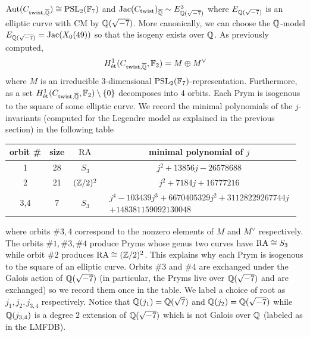 \documentclass[main.tex]{subfiles}
\begin{document}
$\operatorname{\mathrm{Aut}}(C_{\mathrm{twist}, \overline{\mathbb{Q}}}) \cong \mathrm{PSL}_2(\mathbb{F}_7)$ and $\operatorname{\mathrm{Jac}}(C_{\mathrm{twist}})_{\overline{\mathbb{Q}}} \sim E_{\mathbb{Q}(\sqrt{-7})}^3$ where $E_{\mathbb{Q}(\sqrt{-7})}$ is an elliptic curve with CM by $\mathbb{Q}(\sqrt{-7})$. More canonically, we can choose the $\mathbb{Q}$-model $E_{\mathbb{Q}(\sqrt{-7})} = \operatorname{\mathrm{Jac}}(X_0(49))$ so that the isogeny exists over $\mathbb{Q}$. As previously computed,
\[ H^1_{\mathrm{\acute{e}t}}(C_{\mathrm{twist}, \overline{\mathbb{Q}}}, \mathbb{F}_2) = M \oplus M^{\vee} \]
where $M$ is an irreducible $3$-dimensional $\mathrm{PSL}_2(\mathbb{F}_7)$-representation. Furthermore, as a set $H^1_{\mathrm{\acute{e}t}}(C_{\mathrm{twist}, \overline{\mathbb{Q}}}, \mathbb{F}_2) \setminus \{ 0 \}$ decomposes into 4 orbits. Each Prym is isogenous to the square of some elliptic curve. We record the minimal polynomials of the $j$-invariants (computed for the Legendre model as explained in the previous section) in the following table
\begin{center} \label{table:Klein_orbits}
\begin{tabular}{c|c|c|c}
orbit \# & size & $\operatorname{\mathrm{RA}}$ &  minimal polynomial of $j$
\\
\hline
1 & 28 & $S_3$ & $j^2 + 13856 j - 26578688$
\\
2 & 21 & $(\mathbb{Z}/2)^2$ & $j^2 + 7184 j + 16777216$
\\
3,4 & 7 & $S_3$ & $\substack{j^4 - 103439 j^3 + 6670405329 j^2 + 31128229267744 j \\ + 148381159092130048}$
\end{tabular}
\end{center}
where orbits $\# 3,4$ correspond to the nonzero elements of $M$ and $M^{\vee}$ respectively. The orbits $\#1, \#3,\#4$ produce Pryms whose genus two curves have $\operatorname{\mathrm{RA}} \cong S_3$ while orbit $\#2$ produces $\operatorname{\mathrm{RA}} \cong (\mathbb{Z} / 2)^2$. This explains why each Prym is isogenous to the square of an elliptic curve. Orbits $\# 3$ and $\# 4$ are exchanged under the Galois action of $\mathbb{Q}(\sqrt{-7})$ (in particular, the Pryms live over $\mathbb{Q}(\sqrt{-7})$ and are exchanged) so we record them once in the table. We label a choice of root as $j_1, j_2, j_{3,4}$ respectively. Notice that $\mathbb{Q}(j_1) = \mathbb{Q}(\sqrt{7})$ and $\mathbb{Q}(j_2) = \mathbb{Q}(\sqrt{-7})$ while $\mathbb{Q}(j_{3,4})$ is a degree $2$ extension of $\mathbb{Q}(\sqrt{-7})$ which is not Galois over $\mathbb{Q}$ (labeled as \cite{lmfdb:nf-4.0.1372.1} in the LMFDB). 
\par 
\end{document}
